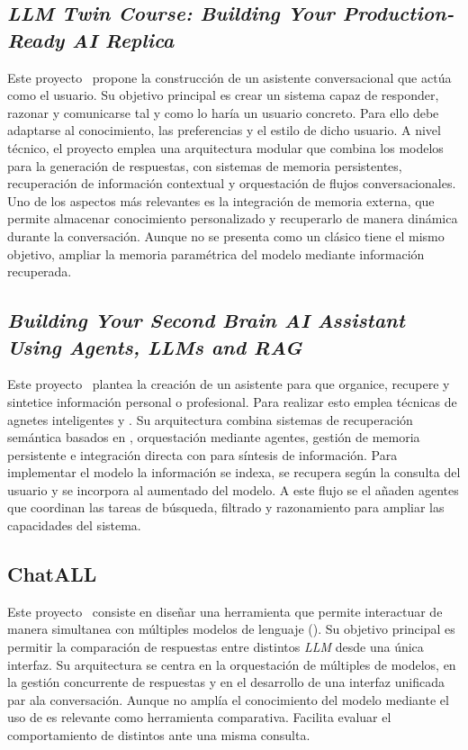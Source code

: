 \subsection{\textit{LLM Twin Course: Building Your Production-Ready AI Replica}}
Este proyecto~\cite{trabajorelacionado:LLM_twin} propone la construcción de un asistente conversacional que actúa como el usuario. Su objetivo principal es crear un sistema capaz de responder, razonar y comunicarse tal y como lo haría un usuario concreto. Para ello debe adaptarse al conocimiento, las preferencias y el estilo de dicho usuario. A nivel técnico, el proyecto emplea una arquitectura modular que combina los modelos  para la generación de respuestas, con sistemas de memoria persistentes, recuperación de información contextual y orquestación de flujos conversacionales. Uno de los aspectos más relevantes es la integración de memoria externa, que permite almacenar conocimiento personalizado y recuperarlo de manera dinámica durante la conversación. Aunque no se presenta como un  clásico tiene el mismo objetivo, ampliar la memoria paramétrica del modelo mediante información recuperada.

\subsection{\textit{Building Your Second Brain AI Assistant Using Agents, LLMs and RAG}}
Este proyecto~\cite{trabajorelacionado:second_brain} plantea la creación de un asistente para que organice, recupere y sintetice información personal o profesional. Para realizar esto emplea técnicas de agnetes inteligentes y . Su arquitectura combina sistemas de recuperación semántica basados en , orquestación mediante agentes, gestión de memoria persistente e integración directa con  para síntesis de información. Para implementar el modelo  la información se indexa, se recupera según la consulta del usuario y se incorpora al  aumentado del modelo. A este flujo se el añaden agentes que coordinan las tareas de búsqueda, filtrado y razonamiento para ampliar las capacidades del sistema.

\subsection{ChatALL}
Este proyecto~\cite{trabajorelacionado:ChatAll} consiste en diseñar una herramienta que permite interactuar de manera simultanea con múltiples modelos de lenguaje (). Su objetivo principal es permitir la comparación de respuestas entre distintos \textit{LLM} desde una única interfaz. Su arquitectura se centra en la orquestación de múltiples  de modelos, en la gestión concurrente de respuestas y en el desarrollo de una interfaz unificada par ala conversación. Aunque no amplía el conocimiento del modelo mediante el uso de  es relevante como herramienta comparativa. Facilita evaluar el comportamiento de distintos  ante una misma consulta.

